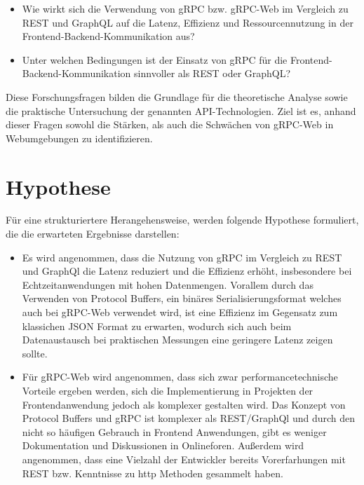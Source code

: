 \begin{itemize}
	\item Wie wirkt sich die Verwendung von gRPC bzw. gRPC-Web im Vergleich zu REST
	und GraphQL auf die Latenz, Effizienz und Ressourcennutzung in der Frontend-Backend-Kommunikation aus?
	
	\item Unter welchen Bedingungen ist der Einsatz von gRPC für die
	Frontend-Backend-Kommunikation sinnvoller als REST oder GraphQL?
	
\end{itemize}

Diese Forschungsfragen bilden die Grundlage für die theoretische Analyse sowie die praktische Untersuchung der genannten API-Technologien. Ziel ist es, anhand dieser Fragen sowohl die Stärken, als auch die Schwächen von gRPC-Web in Webumgebungen zu identifizieren.

\section{Hypothese}
Für eine strukturiertere Herangehensweise, werden folgende Hypothese formuliert, die die erwarteten Ergebnisse darstellen:

\begin{itemize}
	\item Es wird angenommen, dass die Nutzung von gRPC im Vergleich zu REST und GraphQl die Latenz reduziert und die Effizienz erhöht, insbesondere bei Echtzeitanwendungen mit hohen Datenmengen. Vorallem durch das Verwenden von Protocol Buffers, ein binäres Serialisierungsformat welches auch bei gRPC-Web verwendet wird, ist eine Effizienz im Gegensatz zum klassichen JSON Format zu erwarten, wodurch sich auch beim Datenaustausch bei praktischen Messungen eine geringere Latenz zeigen sollte.
	
	\item Für gRPC-Web wird angenommen, dass sich zwar performancetechnische Vorteile ergeben werden, sich die Implementierung in Projekten der Frontendanwendung jedoch als komplexer gestalten wird. Das Konzept von Protocol Buffers und gRPC ist komplexer als REST/GraphQl und durch den nicht so häufigen Gebrauch in Frontend Anwendungen, gibt es weniger Dokumentation und Diskussionen in Onlineforen. 
	Außerdem wird angenommen, dass eine Vielzahl der Entwickler bereits Vorerfarhungen mit REST bzw. Kenntnisse zu http Methoden  gesammelt haben.

	
\end{itemize}

